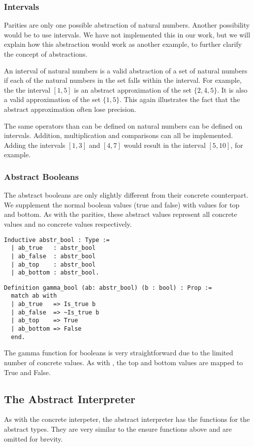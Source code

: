 \subsubsection{Intervals}
Parities are only one possible abstraction of natural numbers. Another
possibility would be to use intervals. We have not implemented this in our
work, but we will explain how this abstraction would work as another example,
to further clarify the concept of abstractions.

An interval of natural numbers is a valid abstraction of a set of natural
numbers if each of the natural numbers in the set falls within the interval.
For example, the the interval $[1,5]$ is an abstract approximation of the set
$\{2, 4, 5\}$. It is also a valid approximation of the set $\{1,5\}$. This
again illustrates the fact that the abstract approximation often lose 
precision.

The same operators than can be defined on natural numbers can be defined on
intervals. Addition, multiplication and comparisons can all be implemented.
Adding the intervals $[1,3]$ and $[4, 7]$ would result in the interval $[5,
10]$, for example. 

\subsubsection{Abstract Booleans}
The abstract booleans are only slightly different from their concrete
counterpart. We supplement the normal boolean values (true and false) with
values for top and bottom. As with the parities, these abstract values
represent all concrete values and no concrete values respectively.

\begin{verbatim}
Inductive abstr_bool : Type :=
  | ab_true   : abstr_bool
  | ab_false  : abstr_bool
  | ab_top    : abstr_bool
  | ab_bottom : abstr_bool.
\end{verbatim}

\begin{verbatim}
Definition gamma_bool (ab: abstr_bool) (b : bool) : Prop :=
  match ab with
  | ab_true   => Is_true b
  | ab_false  => ~Is_true b
  | ab_top    => True
  | ab_bottom => False
  end.
\end{verbatim}

The gamma function for booleans is very straightforward due to the limited
number of concrete values. As with , the top and bottom
values are mapped to True and False.

\subsection{The Abstract Interpreter}
As with the concrete interpeter, the abstract interpreter has the
 functions for the abstract types. 
They are very similar to the ensure functions above and are omitted for brevity. 

